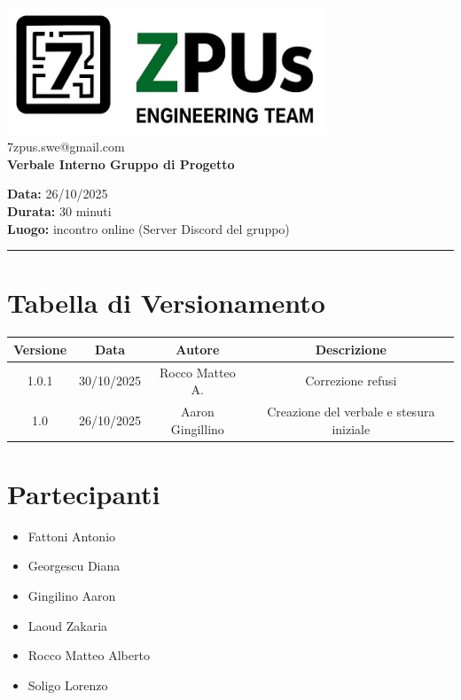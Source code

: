\documentclass[a4paper,12pt]{article}
\begin{document}
\begin{center}
    \includegraphics[width=9.5cm]{../../../assets/logo7zpus.jpg}\\
    \small\hspace{10cm} 7zpus.swe@gmail.com\\
    \Large \textbf{Verbale Interno Gruppo di Progetto}\\
    \vspace{0.5cm}
\end{center}

\noindent
\textbf{Data:} 26/10/2025 \\
\textbf{Durata:}  30 minuti\\
\textbf{Luogo:} incontro online (Server Discord del gruppo)

\vspace{0.3cm}
\hrule
\vspace{0.5cm}

\tableofcontents

\newpage

\section*{Tabella di Versionamento}
    \begin{tabular}{|c|c|c|c|}
        \hline
        \textbf{Versione} & \textbf{Data} & \textbf{Autore} & \textbf{Descrizione} \\
        \hline
        1.0.1 & 30/10/2025 & Rocco Matteo A. & Correzione refusi \\
        \hline
        1.0 & 26/10/2025& Aaron Gingillino& Creazione del verbale e stesura iniziale \\
        \hline
    \end{tabular}


\section*{Partecipanti}
\begin{itemize}[noitemsep]
    \item Fattoni Antonio 
    \item Georgescu Diana
    \item Gingilino Aaron
    \item Laoud Zakaria
    \item Rocco Matteo Alberto
    \item Soligo Lorenzo
\end{itemize}
\end{document}

